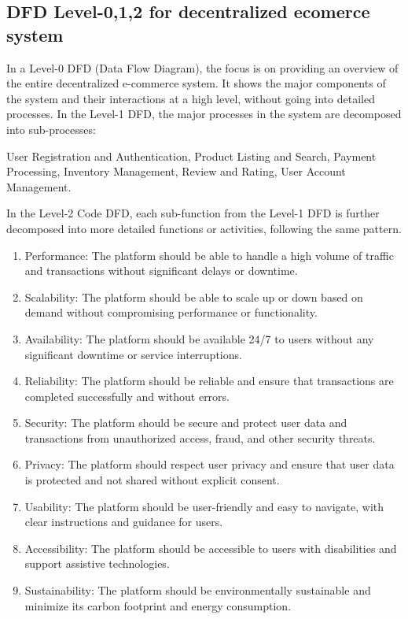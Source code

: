 \documentclass{report}
\begin{document}
\newpage
\subsection{DFD Level-0,1,2 for decentralized ecomerce system}
\vspace{1cm}

In a Level-0 DFD (Data Flow Diagram), the focus is on providing an overview of the entire decentralized e-commerce system. It shows the major components of the system and their interactions at a high level, without going into detailed processes.
In the Level-1 DFD, the major processes in the system are decomposed into sub-processes:

User Registration and Authentication, Product Listing and Search, Payment Processing, Inventory Management, Review and Rating, User Account Management.

In the Level-2 Code DFD, each sub-function from the Level-1 DFD is further decomposed into more detailed functions or activities, following the same pattern.

\begin{enumerate}
    \item Performance: The platform should be able to handle a high volume of traffic and transactions without significant delays or downtime.
    \item Scalability: The platform should be able to scale up or down based on demand without compromising performance or functionality.
    \item Availability: The platform should be available 24/7 to users without any significant downtime or service interruptions.
    \item Reliability: The platform should be reliable and ensure that transactions are completed successfully and without errors.

    \item Security: The platform should be secure and protect user data and transactions from unauthorized access, fraud, and other security threats.
    \item Privacy: The platform should respect user privacy and ensure that user data is protected and not shared without explicit consent.
    \item Usability: The platform should be user-friendly and easy to navigate, with clear instructions and guidance for users.
    \item Accessibility: The platform should be accessible to users with disabilities and support assistive technologies.
    \item Sustainability: The platform should be environmentally sustainable and minimize its carbon footprint and energy consumption.
\end{enumerate}
\end{document}
